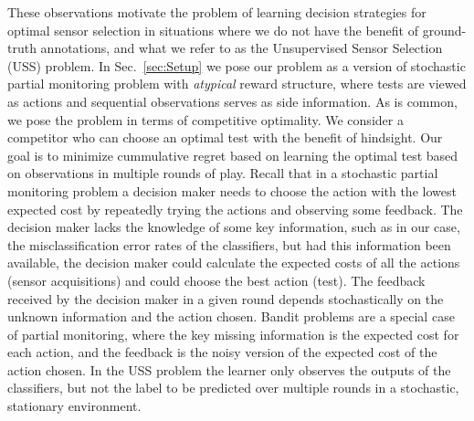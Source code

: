These observations motivate the problem of learning decision strategies for optimal sensor selection in situations where we do not have the benefit of ground-truth annotations, and what we refer to as the Unsupervised Sensor Selection (USS) problem. %
In Sec.~\ref{sec:Setup} we pose our problem as a version of stochastic partial monitoring problem \cite{BaFoPaRaSze14} with \emph{atypical} reward structure, where tests are viewed as actions and sequential observations serves as side information. As is common, we pose the problem in terms of competitive optimality. We consider a competitor who can choose an optimal test with the benefit of hindsight. Our goal is to minimize cummulative regret based on learning the optimal test based on observations in multiple rounds of play. %
Recall that in a stochastic partial monitoring problem a decision maker needs to choose the action with the lowest expected cost by repeatedly trying the actions and observing some feedback.
The decision maker lacks the knowledge of some key information, such as in our case, the misclassification
error rates of the classifiers, but had this information been available, the decision maker could calculate the
expected costs of all the actions (sensor acquisitions) and could choose the best action (test). The feedback received by the decision maker in a given round depends stochastically on the unknown information and the action chosen.
Bandit problems \cite{Tho33} are a special case of partial monitoring, where the key missing information is the expected
cost for each action, and the feedback is the noisy version of the expected cost of the action chosen.
In the USS problem the learner only observes the outputs of the classifiers, but not the label to be predicted over multiple rounds
in a stochastic, stationary environment. 


